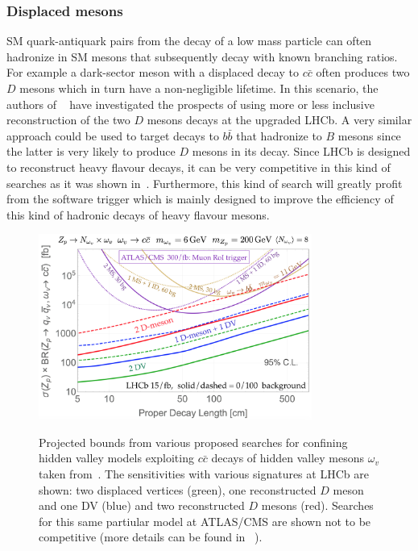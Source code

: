 \subsubsection{Displaced mesons}
SM quark-antiquark pairs from the decay of a low mass particle can often hadronize in SM mesons that subsequently decay with known branching ratios. For example a dark-sector meson with a displaced decay to $c\bar{c}$ often produces two $D$ mesons which in turn have a non-negligible lifetime. In this scenario, the authors of ~\cite{Pierce:2017taw} have investigated the prospects of using more or less inclusive reconstruction of the two $D$ mesons decays at the upgraded LHCb. A very similar approach could be used to target decays to $b\bar{b}$ that hadronize to $B$ mesons since the latter is very likely to produce $D$ mesons in its decay. Since LHCb is designed to reconstruct heavy flavour decays, it can be very competitive in this kind of searches as it was shown in~\cite{Pierce:2017taw}. Furthermore, this kind of search will greatly profit from the software trigger which is mainly designed to improve the efficiency of this kind of hadronic decays of heavy flavour mesons.

\begin{figure}[h]
  \centering
  {\includegraphics[width=0.8\textwidth]{figures/lhcb_hvlimits2.png}}
  \caption{Projected bounds from various proposed searches for confining hidden valley models exploiting $c\bar{c}$ decays of hidden valley mesons $\omega_v$ taken from~\cite{Pierce:2017taw}. The sensitivities with various signatures at LHCb are shown: two displaced vertices (green), one reconstructed $D$ meson and one DV (blue) and two reconstructed $D$ mesons (red). Searches for this same partiular model at ATLAS/CMS are shown not to be competitive (more details can be found in ~\cite{Pierce:2017taw}).}
  \label{fig:HVlim}
\end{figure}

